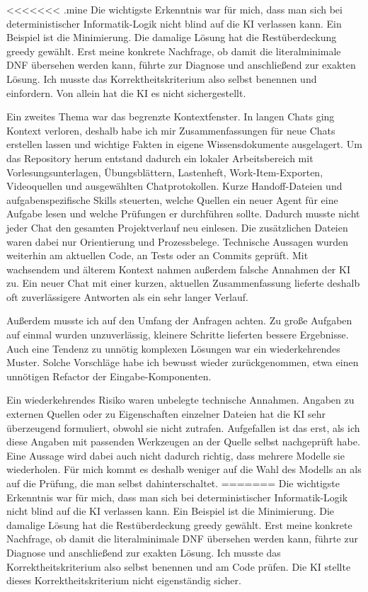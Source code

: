 
<<<<<<< .mine
Die wichtigste Erkenntnis war für mich, dass man sich bei deterministischer
Informatik-Logik nicht blind auf die KI verlassen kann. Ein Beispiel ist die Minimierung.
Die damalige Lösung hat die Restüberdeckung greedy gewählt. Erst meine konkrete Nachfrage,
ob damit die literalminimale DNF übersehen werden kann, führte zur Diagnose und anschließend
zur exakten Lösung. Ich musste das Korrektheitskriterium also selbst benennen und
einfordern. Von allein hat die KI es nicht sichergestellt.

Ein zweites Thema war das begrenzte Kontextfenster. In langen Chats ging Kontext verloren,
deshalb habe ich mir Zusammenfassungen für neue Chats erstellen lassen und wichtige Fakten
in eigene Wissensdokumente ausgelagert. Um das Repository herum entstand dadurch ein
lokaler Arbeitsbereich mit Vorlesungsunterlagen, Übungsblättern, Lastenheft,
Work-Item-Exporten, Videoquellen und ausgewählten Chatprotokollen. Kurze Handoff-Dateien
und aufgabenspezifische Skills steuerten, welche Quellen ein neuer Agent für eine Aufgabe
lesen und welche Prüfungen er durchführen sollte. Dadurch musste nicht jeder Chat den
gesamten Projektverlauf neu einlesen. Die zusätzlichen Dateien waren dabei nur Orientierung
und Prozessbelege. Technische Aussagen wurden weiterhin am aktuellen Code, an Tests oder an
Commits geprüft. Mit wachsendem und älterem Kontext nahmen außerdem falsche Annahmen der KI
zu. Ein neuer Chat mit einer kurzen, aktuellen Zusammenfassung lieferte deshalb oft
zuverlässigere Antworten als ein sehr langer Verlauf.

Außerdem musste ich auf den Umfang der Anfragen achten. Zu große Aufgaben auf einmal wurden
unzuverlässig, kleinere Schritte lieferten bessere Ergebnisse. Auch eine Tendenz zu unnötig
komplexen Lösungen war ein wiederkehrendes Muster. Solche Vorschläge habe ich bewusst wieder
zurückgenommen, etwa einen unnötigen Refactor der Eingabe-Komponenten.

Ein wiederkehrendes Risiko waren unbelegte technische Annahmen. Angaben zu externen Quellen
oder zu Eigenschaften einzelner Dateien hat die KI sehr überzeugend formuliert, obwohl sie
nicht zutrafen. Aufgefallen ist das erst, als ich diese Angaben mit passenden Werkzeugen an
der Quelle selbst nachgeprüft habe. Eine Aussage wird dabei auch nicht dadurch richtig, dass
mehrere Modelle sie wiederholen. Für mich kommt es deshalb weniger auf die Wahl des Modells
an als auf die Prüfung, die man selbst dahinterschaltet.
=======
Die wichtigste Erkenntnis war für mich, dass man sich bei deterministischer
Informatik-Logik nicht blind auf die KI verlassen kann. Ein Beispiel ist die Minimierung.
Die damalige Lösung hat die Restüberdeckung greedy gewählt. Erst meine konkrete Nachfrage,
ob damit die literalminimale DNF übersehen werden kann, führte zur Diagnose und anschließend
zur exakten Lösung. Ich musste das Korrektheitskriterium also selbst benennen und am Code
prüfen. Die KI stellte dieses Korrektheitskriterium nicht eigenständig sicher.

